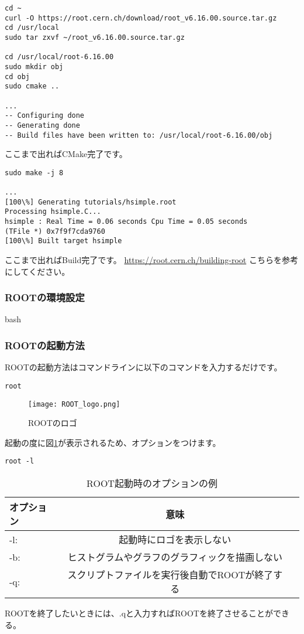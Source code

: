 \documentclass[10pt,a4j]{jarticle}
\begin{document}
\begin{lstlisting}
cd ~
curl -O https://root.cern.ch/download/root_v6.16.00.source.tar.gz
cd /usr/local
sudo tar zxvf ~/root_v6.16.00.source.tar.gz

cd /usr/local/root-6.16.00
sudo mkdir obj
cd obj
sudo cmake ..

...
-- Configuring done
-- Generating done
-- Build files have been written to: /usr/local/root-6.16.00/obj 
\end{lstlisting}
ここまで出ればCMake完了です。
\begin{lstlisting}
sudo make -j 8

...
[100\%] Generating tutorials/hsimple.root
Processing hsimple.C...
hsimple : Real Time = 0.06 seconds Cpu Time = 0.05 seconds
(TFile *) 0x7f9f7cda9760
[100\%] Built target hsimple 
\end{lstlisting}
ここまで出ればBuild完了です。
\url{https://root.cern.ch/building-root}
こちらを参考にしてください。

\subsubsection{ROOTの環境設定}

bash

\subsubsection{ROOTの起動方法}
ROOTの起動方法はコマンドラインに以下のコマンドを入力するだけです。
\begin{lstlisting}
root
\end{lstlisting}
\begin{figure}[ht]
\begin{center}
\texttt{[image: ROOT\_logo.png]}
\caption{ROOTのロゴ}
\label{fig:ROOT_logo}
\end{center}
\end{figure}
起動の度に図\ref{fig:ROOT_logo}が表示されるため、オプションをつけます。
\begin{lstlisting}
root -l
\end{lstlisting}
\begin{table}[ht]
  \caption{ROOT起動時のオプションの例}
  \centering
  \begin{tabular}{lcr}
    \hline
    オプション  & 意味 \\
    \hline \hline
      -l:  & 起動時にロゴを表示しない  \\
      -b:  & ヒストグラムやグラフのグラフィックを描画しない \\
      -q:  & スクリプトファイルを実行後自動でROOTが終了する \\
    \hline
  \end{tabular}
\end{table}
ROOTを終了したいときには、.qと入力すればROOTを終了させることができる。
\end{document}
